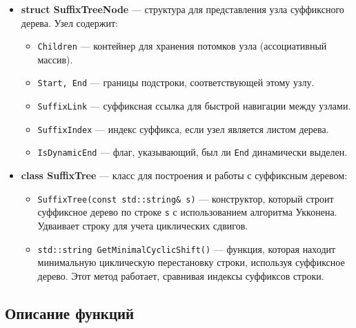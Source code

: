 \documentclass[12pt]{article}
\begin{document}
\begin{itemize}
    \item \textbf{struct SuffixTreeNode} — структура для представления узла суффиксного дерева. Узел содержит:
        \begin{itemize}
            \item \texttt{Children} — контейнер для хранения потомков узла (ассоциативный массив).
            \item \texttt{Start, End} — границы подстроки, соответствующей этому узлу.
            \item \texttt{SuffixLink} — суффиксная ссылка для быстрой навигации между узлами.
            \item \texttt{SuffixIndex} — индекс суффикса, если узел является листом дерева.
            \item \texttt{IsDynamicEnd} — флаг, указывающий, был ли \texttt{End} динамически выделен.
        \end{itemize}
    
    \item \textbf{class SuffixTree} — класс для построения и работы с суффиксным деревом:
        \begin{itemize}
            \item \texttt{SuffixTree(const std::string\& s)} — конструктор, который строит суффиксное дерево по строке \texttt{s} с использованием алгоритма Укконена. Удваивает строку для учета циклических сдвигов.
            \item \texttt{std::string GetMinimalCyclicShift()} — функция, которая находит минимальную циклическую перестановку строки, используя суффиксное дерево. Этот метод работает, сравнивая индексы суффиксов строки.
        \end{itemize}
\end{itemize}

\subsection*{Описание функций}
\end{document}
